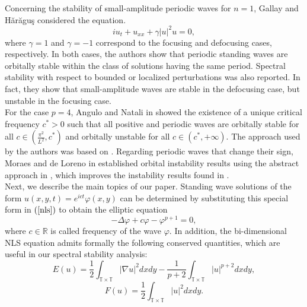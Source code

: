 \documentclass[12pt,reqno,a4paper]{amsart} %
\numberwithin{equation}{section}
\numberwithin{figure}{section}
\begin{document}
	\indent Concerning the stability of small-amplitude periodic waves for $n = 1$, Gallay and H\u ar\u agu\c s  \cite{gallay1} considered the equation.
	\begin{equation}\label{focdef}
		iu_t + u_{xx} + \gamma |u|^2 u = 0,
	\end{equation}
	where $\gamma = 1$ and $\gamma = -1$ correspond to the focusing and defocusing cases, respectively. In both cases, the authors show that periodic standing waves are orbitally stable within the class of solutions having the same period. Spectral stability with respect to bounded or localized perturbations was also reported. In fact, they show that small-amplitude waves are stable in the defocusing case, but unstable in the focusing case.\\
	\indent For the case $p = 4$, Angulo and Natali in \cite{AN2} showed the existence of a unique critical frequency $c^{*} > 0$ such that all positive and periodic waves are orbitally stable for all $c \in \left(\frac{\pi^2}{L^2}, c^{*}\right)$ and orbitally unstable for all $c \in (c^{*}, +\infty)$. The approach used by the authors was based on \cite{GrillakisShatahStraussI}. Regarding periodic waves that change their sign, Moraes and de Loreno in \cite{gabriel-guilherme} established orbital instability results using the abstract approach in \cite{ShatahStraussbook}, which improves the instability results found in \cite{grillakis2}.
	 \\
\indent Next, we describe the main topics of our paper. Standing wave solutions of the form $u(x,y,t)=e^{ict}\varphi(x,y)$ can be determined by substituting this special form in $(\ref{nls})$ to obtain the elliptic equation
	\begin{equation}\label{ode}
		-\Delta \varphi+c\varphi-\varphi^{p+1}=0,\end{equation}
		where $c\in\mathbb{R}$ is called frequency of the wave $\varphi$. In addition, the bi-dimensional NLS equation  admits formally the following conserved quantities, which are useful in our spectral stability analysis:
		\begin{equation}\label{Eu}
			E(u) = \frac{1}{2} \int_{\mathbb{T}\times \mathbb{T}} |\nabla u|^2dxdy - \frac{1}{p+2} \int_{\mathbb{T}\times \mathbb{T}} |u|^{p+2} dxdy,
		\end{equation}
		\begin{equation}\label{Fu}
			F(u)=\frac{1}{2}\int_{\mathbb{T}\times \mathbb{T}}|u|^2dxdy.
		\end{equation}
\end{document}
